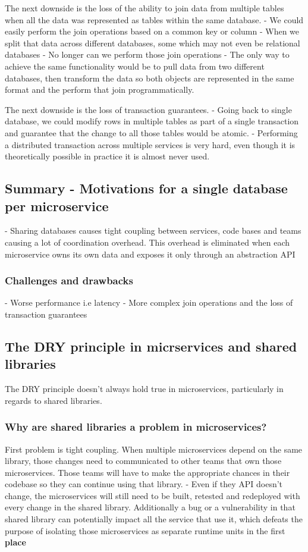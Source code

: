 \documentclass[a4paper, 11pt]{book}
\begin{document}
    The next downside is the loss of the ability to join data from multiple tables when all the data was represented as tables within the same database.
    - We could easily perform the join operations based on a common key or column
    - When we split that data across different databases, some which may not even be relational databases
    - No longer can we perform those join operations
    - The only way to achieve the same functionality would be to pull data from two different databases, then transform the data so both objects are represented in the same format and the perform that join programmatically.

    The next downside is the loss of transaction guarantees.
    - Going back to single database, we could modify rows in multiple tables as part of a single transaction and guarantee that the change to all those tables would be atomic.
    - Performing a distributed transaction across multiple services is very hard, even though it is theoretically possible in practice it is almost never used.

    \subsection{Summary - Motivations for a single database per microservice}
    - Sharing databases causes tight coupling between services, code bases and teams causing a lot of coordination overhead.
    This overhead is eliminated when each microservice owns its own data and exposes it only through an abstraction API

    \subsubsection{Challenges and drawbacks}
    - Worse performance i.e latency
    - More complex join operations and the loss of transaction guarantees

    \subsection{The DRY principle in micrservices and shared libraries}
    The DRY principle doesn't always hold true in microservices, particularly in regards to shared libraries.

    \subsubsection{Why are shared libraries a problem in microservices?}
    First problem is tight coupling.
    When multiple microservices depend on the same library, those changes need to communicated to other teams that own those microservices.
    Those teams will have to make the appropriate chances in their codebase so they can continue using that library.
    - Even if they API doesn't change, the microservices will still need to be built, retested and redeployed with every change in the shared library.
    Additionally a bug or a vulnerability in that shared library can potentially impact all the service that use it, which defeats the purpose of isolating those microservices as separate runtime units in the first \textbf{place}
\end{document}

